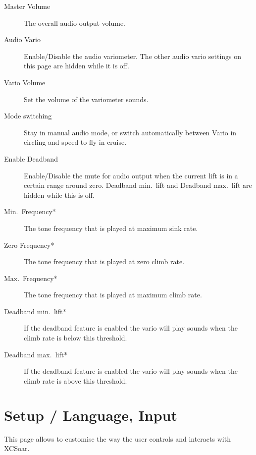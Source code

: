 \begin{description}
\item[Master Volume]  The overall audio output volume.
\item[Audio Vario]  Enable/Disable the audio variometer. The other
  audio vario settings on this page are hidden while it is off.
\item[Vario Volume]  Set the volume of the variometer sounds.
\item[Mode switching]  Stay in manual audio mode, or switch automatically
  between Vario in circling and speed-to-fly in cruise.
\item[Enable Deadband]  Enable/Disable the mute for audio output when the current lift is in a certain range around zero. Deadband min.\ lift and Deadband max.\ lift are hidden while this is off.
\item[Min.\ Frequency*]  The tone frequency that is played at maximum sink rate.
\item[Zero Frequency*]  The tone frequency that is played at zero climb rate.
\item[Max.\ Frequency*]  The tone frequency that is played at maximum climb rate.
\item[Deadband min.\ lift*]  If the deadband feature is enabled the vario will play sounds when the climb rate is below this threshold.
\item[Deadband max.\ lift*]  If the deadband feature is enabled the vario will play sounds when the climb rate is above this threshold.
\end{description}


\section{Setup / Language, Input}\label{sec:interface}

This page allows to customise the way the user controls and interacts with
XCSoar.

